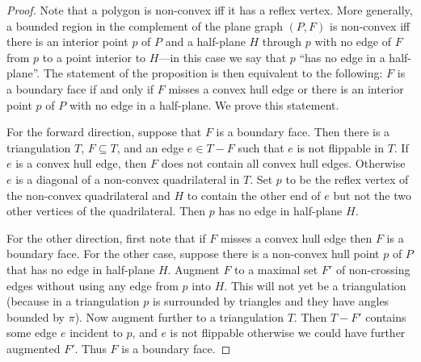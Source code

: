 \begin{proof}
Note that a polygon is non-convex iff it has a reflex vertex.  More generally,
a bounded region in the complement of the plane graph $\left(P,F\right)$ is non-convex iff there is an interior point $p$ of $P$ and a half-plane $H$ through $p$ with no edge of $F$ from $p$ to a point interior to $H$---in this case we say that $p$ ``has no edge in a half-plane''.  
The statement of the proposition is then equivalent to the following:
$F$ is a boundary face if and only if $F$ misses a convex hull edge or there is an interior point $p$ of $P$
with no edge in a half-plane.  We prove this statement.  

For the forward direction, 
suppose that $F$ is a boundary face.  Then there is a triangulation $T$, $F \subseteq T$, and an edge $e \in T - F$ such that $e$ is not flippable in $T$.  If $e$ is a convex hull edge, then $F$ does not contain all convex hull edges.  Otherwise $e$ is a diagonal of a non-convex quadrilateral in $T$.  Set $p$ to be the reflex vertex of the non-convex quadrilateral and $H$ to contain the other end of $e$ but not the two other vertices of the quadrilateral.  Then $p$ has no edge in half-plane $H$.

For the other direction, first note that if 
$F$ misses a convex hull edge then $F$ is a boundary face.  For the other case, suppose there is a non-convex hull point $p$ of $P$ that has no edge in half-plane $H$.  
Augment $F$ to a maximal set $F'$ of non-crossing edges without using any edge from $p$ into $H$.  This will not yet be a triangulation (because in a triangulation $p$ is surrounded by triangles and they have angles bounded by $\pi$).  Now augment further to a triangulation $T$.  Then $T - F'$ contains some edge $e$ incident to $p$, and $e$ is not flippable otherwise we could have further augmented $F'$. Thus $F$ is a boundary face.
\end{proof}



